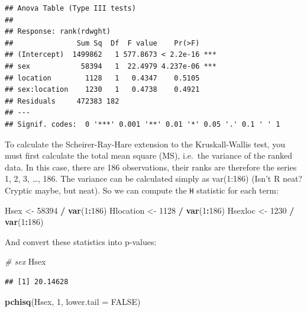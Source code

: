 \documentclass[
  12pt,
]{book}
\newenvironment{Shaded}{\begin{snugshade}}{\end{snugshade}}
\newcommand{\CommentTok}[1]{\textcolor[rgb]{0.56,0.35,0.01}{\textit{#1}}}
\newcommand{\DataTypeTok}[1]{\textcolor[rgb]{0.13,0.29,0.53}{#1}}
\newcommand{\DecValTok}[1]{\textcolor[rgb]{0.00,0.00,0.81}{#1}}
\newcommand{\KeywordTok}[1]{\textcolor[rgb]{0.13,0.29,0.53}{\textbf{#1}}}
\newcommand{\NormalTok}[1]{#1}
\newcommand{\OperatorTok}[1]{\textcolor[rgb]{0.81,0.36,0.00}{\textbf{#1}}}
\newcommand{\OtherTok}[1]{\textcolor[rgb]{0.56,0.35,0.01}{#1}}
\newcommand{\StringTok}[1]{\textcolor[rgb]{0.31,0.60,0.02}{#1}}
\begin{document}
\begin{verbatim}
## Anova Table (Type III tests)
## 
## Response: rank(rdwght)
##               Sum Sq  Df  F value    Pr(>F)    
## (Intercept)  1499862   1 577.8673 < 2.2e-16 ***
## sex            58394   1  22.4979 4.237e-06 ***
## location        1128   1   0.4347    0.5105    
## sex:location    1230   1   0.4738    0.4921    
## Residuals     472383 182                       
## ---
## Signif. codes:  0 '***' 0.001 '**' 0.01 '*' 0.05 '.' 0.1 ' ' 1
\end{verbatim}

To calculate the Scheirer-Ray-Hare extension to the Kruskall-Wallis test, you must first calculate the total mean square (MS), i.e.~the variance of the ranked data. In this case, there are 186 observations, their ranks are therefore the series 1, 2, 3, \ldots, 186. The variance can be calculated simply as var(1:186) (Isn't R neat? Cryptic maybe, but neat). So we can compute the \texttt{H} statistic for each term:

\begin{Shaded}
\begin{Highlighting}[]
\NormalTok{Hsex \textless{}{-}}\StringTok{ }\DecValTok{58394} \OperatorTok{/}\StringTok{ }\KeywordTok{var}\NormalTok{(}\DecValTok{1}\OperatorTok{:}\DecValTok{186}\NormalTok{)}
\NormalTok{Hlocation \textless{}{-}}\StringTok{ }\DecValTok{1128} \OperatorTok{/}\StringTok{ }\KeywordTok{var}\NormalTok{(}\DecValTok{1}\OperatorTok{:}\DecValTok{186}\NormalTok{)}
\NormalTok{Hsexloc \textless{}{-}}\StringTok{ }\DecValTok{1230} \OperatorTok{/}\StringTok{ }\KeywordTok{var}\NormalTok{(}\DecValTok{1}\OperatorTok{:}\DecValTok{186}\NormalTok{)}
\end{Highlighting}
\end{Shaded}

And convert these statistics into p-values:

\begin{Shaded}
\begin{Highlighting}[]
\CommentTok{\# sex}
\NormalTok{Hsex}
\end{Highlighting}
\end{Shaded}

\begin{verbatim}
## [1] 20.14628
\end{verbatim}

\begin{Shaded}
\begin{Highlighting}[]
\KeywordTok{pchisq}\NormalTok{(Hsex, }\DecValTok{1}\NormalTok{, }\DataTypeTok{lower.tail =} \OtherTok{FALSE}\NormalTok{)}
\end{Highlighting}
\end{Shaded}
\end{document}
